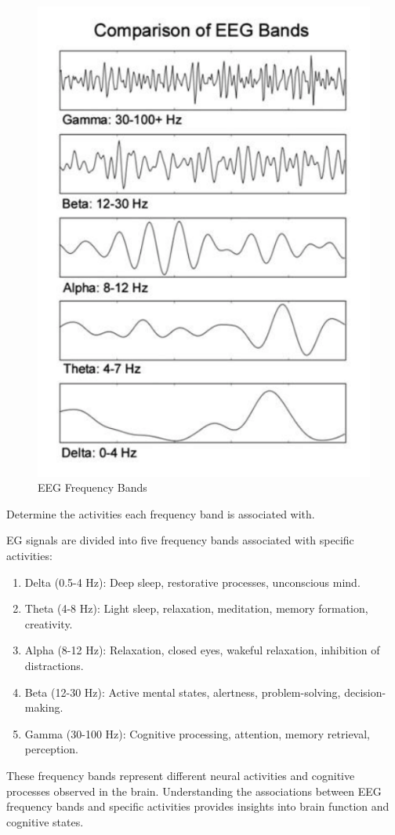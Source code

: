 \documentclass[12pt]{article}
\begin{document}
\begin{figure}[h]
	\centering
	\includegraphics[scale=0.5]{freq-bands}
	\caption{EEG Frequency Bands}
	\label{ffig:figure2}
\end{figure}


\par
Determine the activities each frequency band is associated with.

\begin{qsolve}[]
	EG signals are divided into five frequency bands associated with specific activities:
	\begin{enumerate}
		\item Delta (0.5-4 Hz): Deep sleep, restorative processes, unconscious mind.
		\item  Theta (4-8 Hz): Light sleep, relaxation, meditation, memory formation, creativity.
		\item Alpha (8-12 Hz): Relaxation, closed eyes, wakeful relaxation, inhibition of distractions.
		\item Beta (12-30 Hz): Active mental states, alertness, problem-solving, decision-making.
		\item  Gamma (30-100 Hz): Cognitive processing, attention, memory retrieval, perception.
	\end{enumerate}
	These frequency bands represent different neural activities and cognitive processes observed in the brain. Understanding the associations between EEG frequency bands and specific activities provides insights into brain function and cognitive states.
\end{qsolve}
\end{document}

